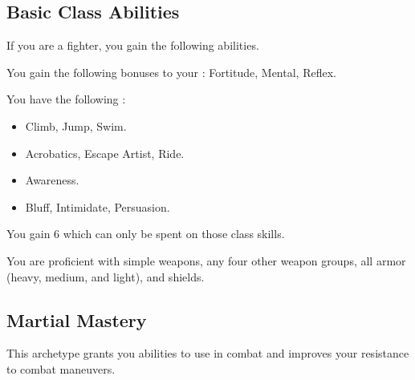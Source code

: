     \subsection{Basic Class Abilities}
        If you are a fighter, you gain the following abilities.

        You gain the following bonuses to your :  Fortitude,  Mental,  Reflex.

        You have the following :
        \begin{itemize}
            \item {} Climb, Jump, Swim.
            \item {} Acrobatics, Escape Artist, Ride.
            \item {} Awareness.
            \item {} Bluff, Intimidate, Persuasion.
        \end{itemize}
        You gain 6  which can only be spent on those class skills.

        You are proficient with simple weapons, any four other weapon groups, all armor (heavy, medium, and light), and shields.

    \subsection{Martial Mastery}
        This archetype grants you abilities to use in combat and improves your resistance to combat maneuvers.

